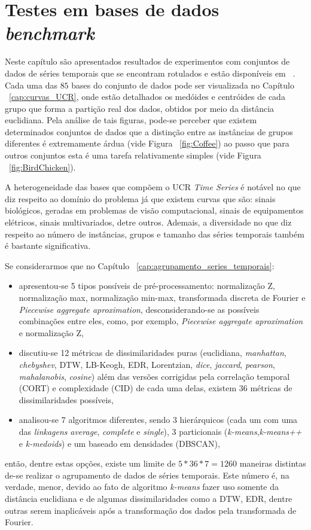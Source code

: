 \chapter{Testes em bases de dados \emph{benchmark}} \label{cap:testes_teoricos}

Neste capítulo são apresentados resultados de experimentos com conjuntos de dados de séries temporais que se encontram rotulados e estão disponíveis em ~\parencite{UCRArchive}. Cada uma das $85$ bases do conjunto de dados pode ser visualizada no Capítulo ~\ref{cap:curvas_UCR}, onde estão detalhados os medóides e centróides de cada grupo que forma a partição real dos dados, obtidos por meio da distância euclidiana. Pela análise de tais figuras, pode-se perceber que existem determinados conjuntos de dados que a distinção entre as instâncias de grupos diferentes é extremamente árdua (vide Figura ~\ref{fig:Coffee})  ao passo que para outros conjuntos esta é uma tarefa relativamente simples (vide Figura ~\ref{fig:BirdChicken}). 

A heterogeneidade das bases que compõem o UCR \emph{Time Series} é notável no que diz respeito ao domínio do problema já que existem curvas que são: sinais biológicos, geradas em problemas de visão computacional, sinais de equipamentos elétricos, sinais multivariados, detre outros. Ademais, a diversidade no que diz respeito ao número de instâncias, grupos e tamanho das séries temporais também é bastante significativa. 

Se considerarmos que no Capítulo ~\ref{cap:agrupamento_series_temporais}:

\begin{itemize}
	\item apresentou-se 5 tipos possíveis de pré-processamento: normalização Z, normalização max, normalização min-max, transformada discreta de Fourier e \emph{Piecewise aggregate aproximation}, desconsiderando-se as possíveis combinações entre eles, como, por exemplo, \emph{Piecewise aggregate aproximation} e normalização Z,
	\item discutiu-se 12 métricas de dissimilaridades puras (euclidiana, \emph{manhattan}, \emph{chebyshev}, DTW, LB-Keogh, EDR, Lorentzian, \emph{dice}, \emph{jaccard}, \emph{pearson}, \emph{mahalanobis}, \emph{cosine}) além das versões corrigidas pela correlação temporal (CORT) e complexidade (CID) de cada uma delas, existem 36 métricas de dissimilaridades  possíveis,
	\item analisou-se 7 algoritmos diferentes, sendo 3 hierárquicos (cada um com uma das \emph{linkagens }\emph{average}, \emph{complete} e \emph{single}), 3 particionais (\emph{k-means},\emph{k-means++} e \emph{k-medoids}) e um baseado em densidades (DBSCAN),
\end{itemize}
 então, dentre estas opções, existe um limite de $5*36*7=1260$ maneiras distintas de-se realizar o agrupamento de dados de séries temporais. Este número é, na verdade, menor, devido ao fato de algoritmo \emph{k-means} fazer uso somente da distância euclidiana e de algumas dissimilaridades como a DTW, EDR, dentre outras serem inaplicáveis após a transformação dos dados pela transformada de Fourier. 
 
